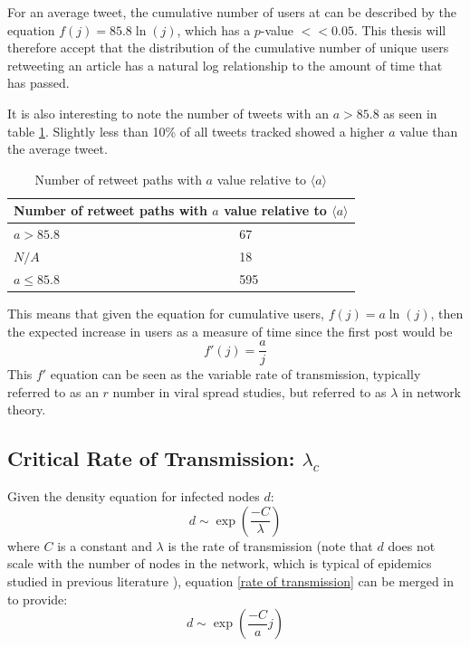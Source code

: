 \documentclass[NETN,manuscript]{stjour-new}
\begin{document}
For an average tweet, the cumulative number of users at can be described by the equation $f(j)=85.8\ln(j)$, which has a $p$-value $<< 0.05$. This thesis will therefore accept that the distribution of the cumulative number of unique users retweeting an article has a natural log relationship to the amount of time that has passed.

It is also interesting to note the number of tweets with an $a > 85.8$ as seen in table \ref{a > 85.58}. Slightly less than 10\% of all tweets tracked showed a higher $a$ value than the average tweet.
\begin{table}[h!]
\centering
\begin{tabular}{ |p{3cm}|p{3cm}|  }
\hline
\multicolumn{2}{|c|}{Number of retweet paths with $a$ value relative to $\langle a \rangle$} \\
\hline
$a > 85.8$  & 67\\
$N/A$ & 18 \\
$ a \leq 85.8$ & 595 \\
\hline
\end{tabular}
\caption{Number of retweet paths with $a$ value relative to $\langle a \rangle$}
\label{a > 85.58}
\end{table}

This means that given the equation for cumulative users, $f(j) = a \ln(j)$, then the expected increase in users as a measure of time since the first post would be 
\begin{equation}
\label{rate of transmission}
    f'(j) = \frac{a}{j} 
\end{equation}
This $f'$ equation can be seen as the variable rate of transmission, typically referred to as an $r$ number in viral spread studies, but referred to as $\lambda$ in network theory. 
\subsection{Critical Rate of Transmission: $\lambda_c$}

Given the density equation for infected nodes $d$: \begin{equation}
    \label{densityequation}
    d \sim \exp\left(\frac{ - C}{\lambda}\right)
\end{equation} where $C$ is a constant and $\lambda$ is the rate of transmission \citep{pastor2001epidemic} (note that $d$ does not scale with the number of nodes in the network, which is typical of epidemics studied in previous literature \citep{marro2005nonequilibrium}), equation \ref{rate of transmission} can be merged in to provide:
\begin{equation}
    d \sim \exp\left(\frac{ - C}{a}j\right)
\end{equation}
\end{document}
